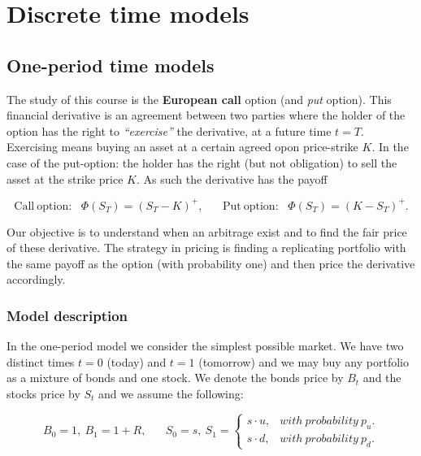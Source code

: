 \documentclass[
]{book}
\begin{document}
\hypertarget{discrete-time-models}{%
\section{Discrete time models}\label{discrete-time-models}}

\hypertarget{one-period-time-models}{%
\subsection{One-period time models}\label{one-period-time-models}}

The study of this course is the \textbf{European call} option (and \emph{put} option). This financial derivative is an agreement between two parties where the holder of the option has the right to \emph{``exercise''} the derivative, at a future time \(t=T\). Exercising means buying an asset at a certain agreed opon price-strike \(K\). In the case of the put-option: the holder has the right (but not obligation) to sell the asset at the strike price \(K\). As such the derivative has the payoff

\[\text{Call}\ \text{option:}\hspace{10pt}\Phi(S_T)=(S_T-K)^+,\hspace{20pt}\text{Put}\ \text{option:}\hspace{10pt}\Phi(S_T)=(K-S_T)^+.\]

Our objective is to understand when an arbitrage exist and to find the fair price of these derivative. The strategy in pricing is finding a replicating portfolio with the same payoff as the option (with probability one) and then price the derivative accordingly.

\hypertarget{model-description}{%
\subsubsection{Model description}\label{model-description}}

In the one-period model we consider the simplest possible market. We have two distinct times \(t=0\) (today) and \(t=1\) (tomorrow) and we may buy any portfolio as a mixture of bonds and one stock. We denote the bonds price by \(B_t\) and the stocks price by \(S_t\) and we assume the following:

\[
B_0=1,\ B_1=1+R,\hspace{20pt}S_0=s,\ S_1=\left\{\begin{matrix}s\cdot u, & with\ probability\ p_u.\\s\cdot d, & with\ probability\ p_d.\end{matrix}\right.
\]
\end{document}
